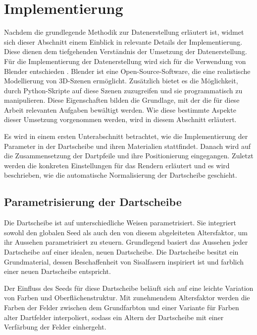 
\section{Implementierung}
\label{sec:daten:implementierung}

Nachdem die grundlegende Methodik zur Datenerstellung erläutert ist, widmet sich dieser Abschnitt einem Einblick in relevante Details der Implementierung. Diese dienen dem tiefgehenden Verständnis der Umsetzung der Datenerstellung. Für die Implementierung der Datenerstellung wird sich für die Verwendung von Blender entschieden \cite{blender}. Blender ist eine Open-Source-Software, die eine realistische Modellierung von 3D-Szenen ermöglicht. Zusätzlich bietet es die Möglichkeit, durch Python-Skripte auf diese Szenen zuzugreifen und sie programmatisch zu manipulieren. Diese Eigenschaften bilden die Grundlage, mit der die für diese Arbeit relevanten Aufgaben bewältigt werden. Wie diese bestimmte Aspekte dieser Umsetzung vorgenommen werden, wird in diesem Abschnitt erläutert.

Es wird in einem ersten Unterabschnitt betrachtet, wie die Implementierung der Parameter in der Dartscheibe und ihren Materialien stattfindet. Danach wird auf die Zusammensetzung der Dartpfeile und ihre Positionierung eingegangen. Zuletzt werden die konkreten Einstellungen für das Rendern erläutert und es wird beschrieben, wie die automatische Normalisierung der Dartscheibe geschieht.


\subsection{Parametrisierung der Dartscheibe}  %
\label{sec:dartscheibe_parametrisierung}

Die Dartscheibe ist auf unterschiedliche Weisen parametrisiert. Sie integriert sowohl den globalen Seed als auch den von diesem abgeleiteten Altersfaktor, um ihr Aussehen parametrisiert zu steuern. Grundlegend basiert das Aussehen jeder Dartscheibe auf einer idealen, neuen Dartscheibe. Die Dartscheibe besitzt ein Grundmaterial, dessen Beschaffenheit von Sisalfasern inspiriert ist und farblich einer neuen Dartscheibe entspricht.

Der Einfluss des Seeds für diese Dartscheibe beläuft sich auf eine leichte Variation von Farben und Oberflächenstruktur. Mit zunehmendem Altersfaktor werden die Farben der Felder zwischen dem Grundfarbton und einer Variante für Farben alter Dartfelder interpoliert, sodass ein Altern der Dartscheibe mit einer Verfärbung der Felder einhergeht.

